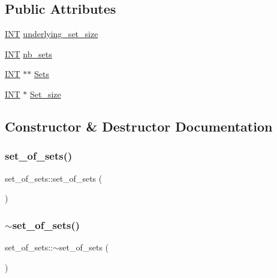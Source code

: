 \subsection*{Public Attributes}
\begin{DoxyCompactItemize}
\item 
\mbox{\hyperlink{galois_8h_a09fddde158a3a20bd2dcadb609de11dc}{I\+NT}} \mbox{\hyperlink{classset__of__sets_a5af40b6f333f35f29c948c252043bfc0}{underlying\+\_\+set\+\_\+size}}
\item 
\mbox{\hyperlink{galois_8h_a09fddde158a3a20bd2dcadb609de11dc}{I\+NT}} \mbox{\hyperlink{classset__of__sets_a2930f0f9f4726f78dd91990cb26bcf28}{nb\+\_\+sets}}
\item 
\mbox{\hyperlink{galois_8h_a09fddde158a3a20bd2dcadb609de11dc}{I\+NT}} $\ast$$\ast$ \mbox{\hyperlink{classset__of__sets_a096b0783ca4a716ced8d178f4b363125}{Sets}}
\item 
\mbox{\hyperlink{galois_8h_a09fddde158a3a20bd2dcadb609de11dc}{I\+NT}} $\ast$ \mbox{\hyperlink{classset__of__sets_a49ccda4912e38ea41d88acf4bff1cb33}{Set\+\_\+size}}
\end{DoxyCompactItemize}


\subsection{Constructor \& Destructor Documentation}
\mbox{\label{classset__of__sets_ad07d3908a5f6972e2defe4db643dcb1e}} 
\subsubsection{\texorpdfstring{set\+\_\+of\+\_\+sets()}{set\_of\_sets()}}
{\footnotesize\ttfamily set\+\_\+of\+\_\+sets\+::set\+\_\+of\+\_\+sets (\begin{DoxyParamCaption}{ }\end{DoxyParamCaption})}

\mbox{\label{classset__of__sets_ab91749ac773a8686f9372652c1d7d43e}} 
\subsubsection{\texorpdfstring{$\sim$set\+\_\+of\+\_\+sets()}{~set\_of\_sets()}}
{\footnotesize\ttfamily set\+\_\+of\+\_\+sets\+::$\sim$set\+\_\+of\+\_\+sets (\begin{DoxyParamCaption}{ }\end{DoxyParamCaption})}



